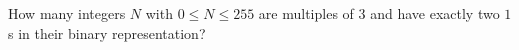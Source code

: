 How many integers $N$ with $0\le N\le255$ are multiples of $3$ and have exactly two $1$s in their binary representation?

